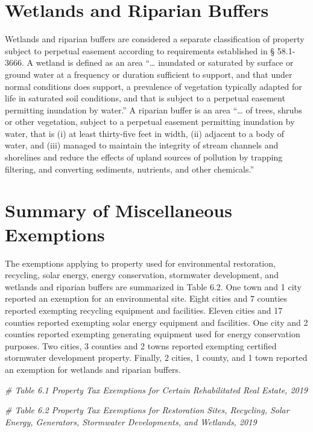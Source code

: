 \documentclass[
]{book}
\newenvironment{Shaded}{\begin{snugshade}}{\end{snugshade}}
\newcommand{\CommentTok}[1]{\textcolor[rgb]{0.56,0.35,0.01}{\textit{#1}}}
\begin{document}
\hypertarget{wetlands-and-riparian-buffers}{%
\section{Wetlands and Riparian Buffers}\label{wetlands-and-riparian-buffers}}

Wetlands and riparian buffers are considered a separate classification of property subject to perpetual easement according to requirements established in § 58.1-3666. A wetland is defined as an area ``\ldots{} inundated or saturated by surface or ground water at a frequency or duration sufficient to support, and that under normal conditions does support, a prevalence of vegetation typically adapted for life in saturated soil conditions, and that is subject to a perpetual easement permitting inundation by water.'' A riparian buffer is an area ``\ldots{} of trees, shrubs or other vegetation, subject to a perpetual easement permitting inundation by water, that is (i) at least thirty-five feet in width, (ii) adjacent to a body of water, and (iii) managed to maintain the integrity of stream channels and shorelines and reduce the effects of upland sources of pollution by trapping filtering, and converting sediments, nutrients, and other chemicals.''

\hypertarget{summary-of-miscellaneous-exemptions}{%
\section{Summary of Miscellaneous Exemptions}\label{summary-of-miscellaneous-exemptions}}

The exemptions applying to property used for environmental restoration, recycling, solar energy, energy conservation, stormwater development, and wetlands and riparian buffers are summarized in Table 6.2. One town and 1 city reported an exemption for an environmental site. Eight cities and 7 counties reported exempting recycling equipment and facilities. Eleven cities and 17 counties reported exempting solar energy equipment and facilities. One city and 2 counties reported exempting generating equipment used for energy conservation purposes. Two cities, 3 counties and 2 towns reported exempting certified stormwater development property. Finally, 2 cities, 1 county, and 1 town reported an exemption for wetlands and riparian buffers.

\begin{Shaded}
\begin{Highlighting}[]
\CommentTok{\# Table 6.1 Property Tax Exemptions for Certain Rehabilitated Real Estate, 2019}

\CommentTok{\# Table 6.2 Property Tax Exemptions for Restoration Sites, Recycling, Solar Energy, Generators, Stormwater Developments, and Wetlands, 2019}
\end{Highlighting}
\end{Shaded}
\end{document}
